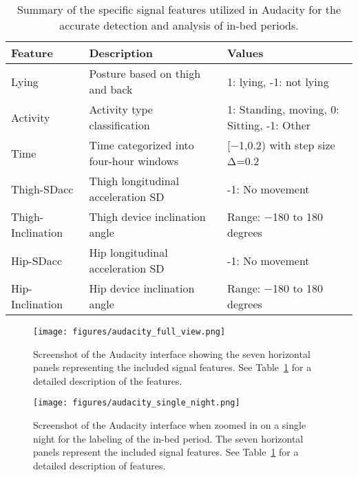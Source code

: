 \documentclass[
  10pt,
]{scrbook}
\begin{document}
\pagebreak

\begingroup

\footnotesize

\hypertarget{tbl-man_signal_features}{}
\begin{longtable}{lll}
\caption{\label{tbl-man_signal_features}Summary of the specific signal features utilized in Audacity for the
accurate detection and analysis of in-bed periods. }\tabularnewline

\toprule
Feature & Description & Values \\ 
\midrule
Lying & Posture based on thigh and back & 1: lying, -1: not lying \\ 
Activity & Activity type classification & 1: Standing, moving, 0: Sitting, -1: Other \\ 
Time & Time categorized into four-hour windows & [−1,0.2) with step size Δ=0.2 \\ 
Thigh-SDacc & Thigh longitudinal acceleration SD & -1: No movement \\ 
Thigh-Inclination & Thigh device inclination angle & Range: −180 to 180 degrees \\ 
Hip-SDacc & Hip longitudinal acceleration SD & -1: No movement \\ 
Hip-Inclination & Hip device inclination angle & Range: −180 to 180 degrees \\ 
\bottomrule
\end{longtable}

\endgroup

\begin{figure}

{\centering \texttt{[image: figures/audacity\_full\_view.png]}

}

\caption{\label{fig-screen_full}Screenshot of the Audacity interface
showing the seven horizontal panels representing the included signal
features. See Table~\ref{tbl-man_signal_features} for a detailed
description of the features.}

\end{figure}

\begin{figure}

{\centering \texttt{[image: figures/audacity\_single\_night.png]}

}

\caption{\label{fig-screen_night}Screenshot of the Audacity interface
when zoomed in on a single night for the labeling of the in-bed period.
The seven horizontal panels represent the included signal features. See
Table~\ref{tbl-man_signal_features} for a detailed description of
features.}

\end{figure}
\end{document}
